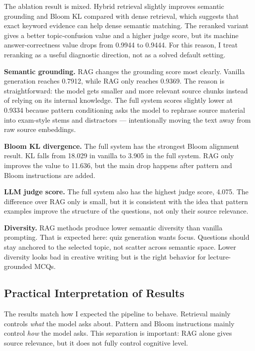 \documentclass[12pt,a4paper]{article}
\begin{document}
The ablation result is mixed. Hybrid retrieval slightly improves semantic
grounding and Bloom KL compared with dense retrieval, which suggests that
exact keyword evidence can help dense semantic matching. The reranked
variant gives a better topic-confusion value and a higher judge score, but
its machine answer-correctness value drops from 0.9944 to 0.9444. For this
reason, I treat reranking as a useful diagnostic direction, not as a solved
default setting.

\textbf{Semantic grounding.} RAG changes the grounding score most clearly.
Vanilla generation reaches 0.7912, while RAG only reaches 0.9369. The
reason is straightforward: the model gets smaller and more relevant source
chunks instead of relying on its internal knowledge. The full system scores slightly lower at 0.9334 because pattern
conditioning asks the model to rephrase source material into exam-style
stems and distractors — intentionally moving the text away from raw source
embeddings.

\textbf{Bloom KL divergence.} The full system has the strongest Bloom
alignment result. KL falls from 18.029 in vanilla to 3.905 in the full
system. RAG only improves the value to 11.636, but the main drop happens
after pattern and Bloom instructions are added.

\textbf{LLM judge score.} The full system also has the highest judge score,
4.075. The difference over RAG only is small, but it is consistent with the
idea that pattern examples improve the structure of the questions, not only
their source relevance.

\textbf{Diversity.} RAG methods produce lower semantic diversity than
vanilla prompting. That is expected here: quiz generation wants focus.
Questions should stay anchored to the selected topic, not scatter across
semantic space. Lower diversity looks bad in creative writing but is the
right behavior for lecture-grounded MCQs.

\subsection{Practical Interpretation of Results}

The results match how I expected the pipeline to behave. Retrieval mainly
controls \textit{what} the model asks about. Pattern and Bloom instructions
mainly control \textit{how} the model asks. This separation is important:
RAG alone gives source relevance, but it does not fully control cognitive
level.
\end{document}
